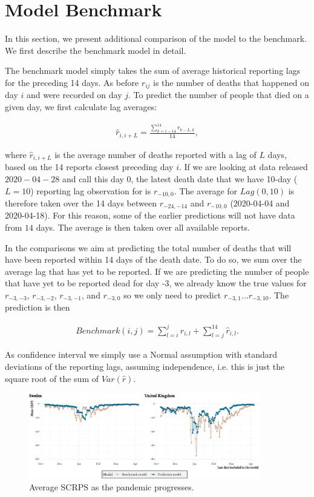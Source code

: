 \section{Model Benchmark}
In this section, we present additional comparison of the model to the benchmark. We first describe the benchmark model in detail.

The benchmark model simply takes the sum of average historical reporting lags for the preceding 14 days. As before $r_{ij}$ is the number of deaths that happened on day $i$ and were recorded on day $j$. To predict the number of people that died on a given day, we first calculate lag averages:

\begin{align}
    \hat{r}_{i, i+L} = \frac{\sum^{14}_{k=i-14} r_{k - L, k}}{14},
\end{align}

where $\hat{r}_{i, i+L}$ is the average number of deaths reported with a lag of $L$ days, based on the 14 reports closest preceding day $i$. If we are looking at data released $2020-04-28$ and call this day 0, the latest death date that we have 10-day ($L=10$) reporting lag observation for is $r_{-10,0}$. The average for $Lag(0, 10)$ is therefore taken over the 14 days between $r_{-24,-14}$ and $r_{-10,0}$ (2020-04-04 and 2020-04-18). For this reason, some of the earlier predictions will not have data from $14$ days. The average is then taken over all available reports.

In the comparisons we aim at predicting the total number of deaths that will have been reported within 14 days of the death date. To do so, we sum over the average lag that has yet to be reported. If we are predicting the number of people that have yet to be reported dead for day -3, we already know the true values for $r_{-3,-3}$, $r_{-3,-2}$, $r_{-3,-1}$, and $r_{-3,0}$ so we only need to predict $r_{-3,1}\ldots r_{-3,10}$. The prediction is then

\begin{align}
    Benchmark(i, j) = \sum_{l=i}^{j} r_{i,l}+ \sum_{l = j}^{14} \hat{r}_{i, l}.
\end{align}

As confidence interval we simply use a Normal assumption with standard deviations of the reporting lags, assuming independence, i.e. this is just the square root of the sum of $Var(\hat{r})$.

\begin{figure}
    \centering
    \includegraphics[width=0.9\textwidth]{plots/CRPS_over_states}
    \caption{Average SCRPS as the pandemic progresses.}
    \label{fig:SCRPS_states}
\end{figure}

